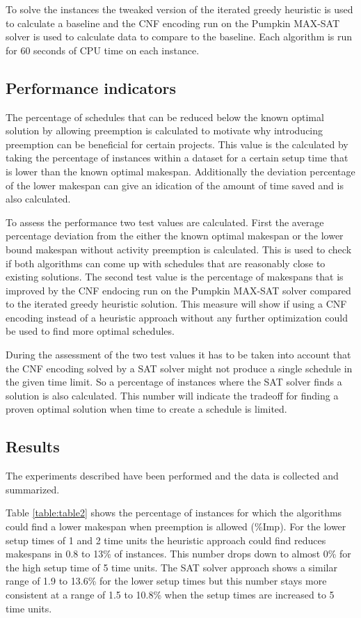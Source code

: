To solve the instances the tweaked version of the iterated greedy heuristic is used to calculate a baseline and the CNF encoding run on the Pumpkin MAX-SAT solver is used to calculate data to compare to the baseline. Each algorithm is run for 60 seconds of CPU time on each instance.

\subsection{Performance indicators}
The percentage of schedules that can be reduced below the known optimal solution by allowing preemption is calculated to motivate why introducing preemption can be beneficial for certain projects. This value is the calculated by taking the percentage of instances within a dataset for a certain setup time that is lower than the known optimal makespan. Additionally the deviation percentage of the lower makespan can give an idication of the amount of time saved and is also calculated.

To assess the performance two test values are calculated. First the average percentage deviation from the either the known optimal makespan or the lower bound makespan without activity preemption is calculated. This is used to check if both algorithms can come up with schedules that are reasonably close to existing solutions. The second test value is the percentage of makespans that is improved by the CNF endocing run on the Pumpkin MAX-SAT solver compared to the iterated greedy heuristic solution. This measure will show if using a CNF encoding instead of a heuristic approach without any further optimization could be used to find more optimal schedules.

During the assessment of the two test values it has to be taken into account that the CNF encoding solved by a SAT solver might not produce a single schedule in the given time limit. So a percentage of instances where the SAT solver finds a solution is also calculated. This number will indicate the tradeoff for finding a proven optimal solution when time to create a schedule is limited.

\subsection{Results}
The experiments described have been performed and the data is collected and summarized.

Table \ref{table:table2} shows the percentage of instances for which the algorithms could find a lower makespan when preemption is allowed (\%Imp). For the lower setup times of 1 and 2 time units the heuristic approach could find reduces makespans in 0.8 to 13\% of instances. This number drops down to almost 0\% for the high setup time of 5 time units. The SAT solver approach shows a similar range of 1.9 to 13.6\% for the lower setup times but this number stays more consistent at a range of 1.5 to 10.8\% when the setup times are increased to 5 time units.

